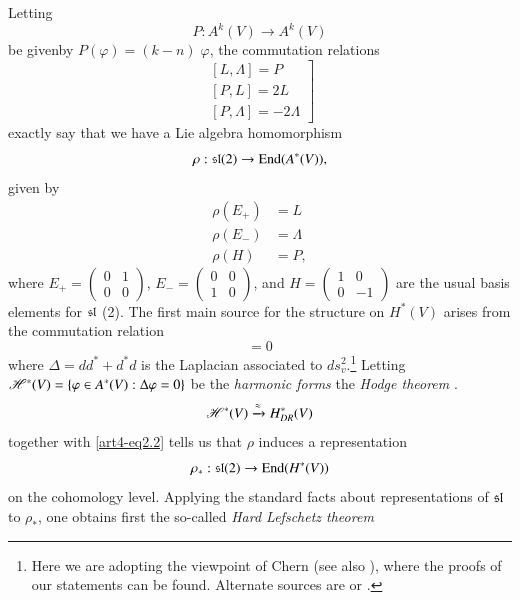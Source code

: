 Letting 
$$
P: A^k (V) \to A^k (V)
$$
be given\pageoriginale  by $P(\varphi) = (k-n)\; \varphi$, the commutation relations
\setcounter{equation}{0}
\begin{equation}
\left.
\begin{matrix}
[L, \Lambda]  = P\\
[P, L]  = 2L\\
[P, \Lambda]  = - 2 \Lambda 
\end{matrix}
\right] \label{art4-eq2.1}
\end{equation}
exactly say that we have a Lie algebra homomorphism
$$
\rho: \mathfrak{s}\mathfrak{l}(2) \to \operatorname{End} (A^\ast (V)),
$$
given by 
\begin{align*}
\rho (E_+) & = L \\
\rho(E_-) & = \Lambda\\
\rho (H) & = P,
\end{align*}
where $E_+ = \left(\begin{smallmatrix}
0 & 1\\
0 & 0
\end{smallmatrix} \right)$, $E_- = \left(\begin{smallmatrix}
0 & 0\\
1 & 0
\end{smallmatrix} \right)$, and $H = \left(\begin{smallmatrix}
1 & 0\\
0 & -1
\end{smallmatrix} \right)$ are the usual basis elements for $\mathfrak{s} \mathfrak{l}$ (2). The first main source for the structure on $H^\ast(V)$ arises from the commutation relation
\begin{equation}
[\rho, \Delta] = 0 \label{art4-eq2.2}
\end{equation}
where $\Delta = dd^\ast + d^\ast d$ is the Laplacian associated to $ds^2_v$.\footnote{Here we are adopting the viewpoint of Chern \cite{art4-key7} (see also \cite{art4-key46}), where the proofs of our statements can be found. Alternate sources are \cite{art4-key45} or \cite{art-4key47}.} Letting $\mathscr{H}^\ast(V) =\{\varphi \in A^{\ast} (V) : \Delta \varphi = 0\}$ be the \textit{harmonic forms} the \textit{Hodge theorem} \cite{art4-key44}.
$$
\mathscr{H}^\ast (V) \xrightarrow{\approx} H^\ast_{DR} (V)
$$
together with \eqref{art4-eq2.2} tells us that $\rho$ induces a representation
\begin{equation}
\rho_\ast : \mathfrak{s}\mathfrak{l} (2) \to \operatorname{End} (H^\ast (V)) \label{art4-eq2.4}
\end{equation}
on the cohomology level. Applying the standard facts about representations of $\mathfrak{s} \mathfrak{l}$ to $\rho_\ast$, one obtains first the so-called \textit{Hard Lefschetz theorem}
